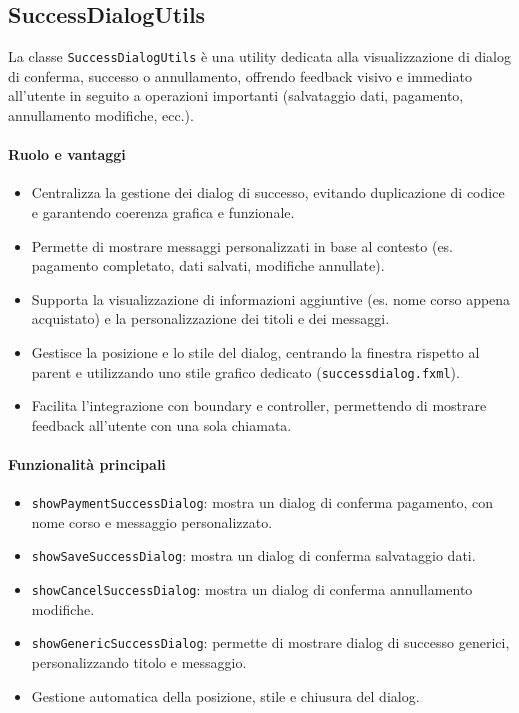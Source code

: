 \subsection{SuccessDialogUtils}
La classe \texttt{SuccessDialogUtils} è una utility dedicata alla visualizzazione di dialog di conferma, successo o annullamento, offrendo feedback visivo e immediato all'utente in seguito a operazioni importanti (salvataggio dati, pagamento, annullamento modifiche, ecc.).

\paragraph{Ruolo e vantaggi}
\begin{itemize}
    \item Centralizza la gestione dei dialog di successo, evitando duplicazione di codice e garantendo coerenza grafica e funzionale.
    \item Permette di mostrare messaggi personalizzati in base al contesto (es. pagamento completato, dati salvati, modifiche annullate).
    \item Supporta la visualizzazione di informazioni aggiuntive (es. nome corso appena acquistato) e la personalizzazione dei titoli e dei messaggi.
    \item Gestisce la posizione e lo stile del dialog, centrando la finestra rispetto al parent e utilizzando uno stile grafico dedicato (\texttt{successdialog.fxml}).
    \item Facilita l'integrazione con boundary e controller, permettendo di mostrare feedback all'utente con una sola chiamata.
\end{itemize}

\paragraph{Funzionalità principali}
\begin{itemize}
    \item \texttt{showPaymentSuccessDialog}: mostra un dialog di conferma pagamento, con nome corso e messaggio personalizzato.
    \item \texttt{showSaveSuccessDialog}: mostra un dialog di conferma salvataggio dati.
    \item \texttt{showCancelSuccessDialog}: mostra un dialog di conferma annullamento modifiche.
    \item \texttt{showGenericSuccessDialog}: permette di mostrare dialog di successo generici, personalizzando titolo e messaggio.
    \item Gestione automatica della posizione, stile e chiusura del dialog.
\end{itemize}

